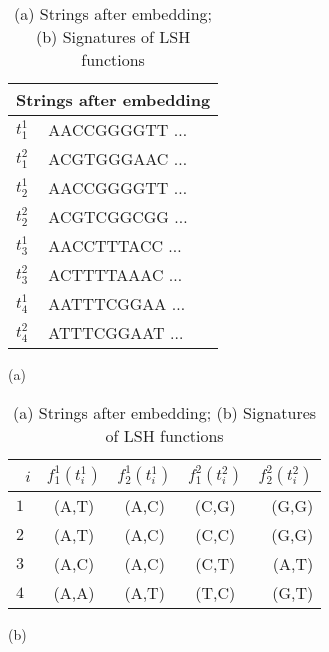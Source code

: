 \begin{table}[t]
\centering
\begin{minipage}[]{0.4\textwidth}
\centering
\begin{tabular}{ |l|l| } 
  \hline
  \multicolumn{2}{|c|}{Strings after embedding} \\
  \hline
  $t_1^1$ & AACCGGGGTT $\dots$ \\
  $t_1^2$ & ACGTGGGAAC $\dots$\\
  $t_2^1$ & AACCGGGGTT $\dots$\\
  $t_2^2$ & ACGTCGGCGG $\dots$\\
  $t_3^1$ & AACCTTTACC $\dots$\\
  $t_3^2$ & ACTTTTAAAC $\dots$\\
  $t_4^1$ & AATTTCGGAA $\dots$\\
  $t_4^2$ & ATTTCGGAAT $\dots$\\
  \hline
\end{tabular}
\centerline{(a)}
\end{minipage}
\begin{minipage}[]{0.6\textwidth}
\centering
\begin{tabular}{l*{3}{c}r}
\ $i$              &$f_1^1(t_i^1)$  &$f_2^1(t_i^1)$ & $f_1^2(t_i^2)$ & $f_2^2(t_i^2)$   \\
\hline
$1$    & (A,T) & (A,C) & (C,G) & (G,G) \\
$2$     & (A,T) & (A,C) & (C,C) & (G,G)  \\
$3$    & (A,C) & (A,C) & (C,T) & (A,T) \\
$4$     & (A,A) & (A,T) & (T,C) & (G,T)  \\
\end{tabular}
\centerline{(b)}
\end{minipage}
\medskip
\caption{(a) Strings after embedding; (b) Signatures of LSH functions}  
\label{tab:strs2}
\end{table}



